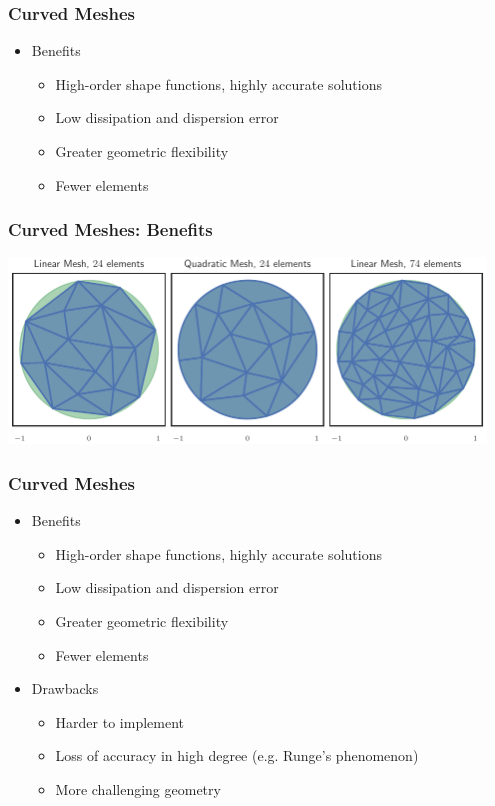 \documentclass{beamer}
\begin{document}
\begin{frame}
\frametitle{Curved Meshes}
\begin{itemize}
\item Benefits
\begin{itemize}
\pause
\item High-order shape functions, highly accurate solutions
\pause
\item Low dissipation and dispersion error
\pause
\item Greater geometric flexibility
\pause
\item Fewer elements
\end{itemize}
\end{itemize}
\end{frame}

\begin{frame}
\frametitle{Curved Meshes: Benefits}
\begin{center}
\includegraphics[width=0.95\textwidth]
                {../images/solution-transfer/main_figure27.pdf}
\end{center}
\end{frame}

\begin{frame}
\frametitle{Curved Meshes}
\begin{itemize}
\item Benefits
\begin{itemize}
\item High-order shape functions, highly accurate solutions
\item Low dissipation and dispersion error
\item Greater geometric flexibility
\item Fewer elements
\end{itemize}
\item Drawbacks
\begin{itemize}
\pause
\item Harder to implement
\pause
\item Loss of accuracy in high degree (e.g. Runge's phenomenon)
\pause
\item More challenging geometry
\end{itemize}
\end{itemize}
\end{frame}
\end{document}
